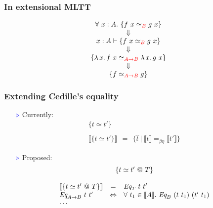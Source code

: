 \documentclass[11pt]{beamer}
\newcommand{\interp}[1]{\llbracket #1 \rrbracket}
\newcommand{\myb}[0]{\ensuremath{\textcolor{blue}{\triangleright}}}
\begin{document}
\begin{frame}
  \frametitle{In extensional MLTT}

\Large

  \[
  \begin{array}{c}
    \forall\ x : A.\ \{ f\ x \simeq_{\color{red}B} g\ x\}
    \\    
    \Downarrow
    \\    
    x : A \vdash \{ f\ x \simeq_{\color{red}B} g\ x \}
    \\
    \Downarrow
    \\    
    \{ \lambda\, x.\, f\ x \simeq_{\color{red}A\to B} \lambda\, x.\, g\ x \}
    \\
    \Downarrow
    \\    
    \{ f \simeq_{\color{red}A\to B} g \}
  \end{array}
  \]

  \vspace{1cm}

\pause
  \begin{center}
\color{purple}
\Large
    \end{center}

  \end{frame}

\begin{frame}
  \frametitle{Extending Cedille's equality}

  \begin{itemize}
    \item[$\myb$]
  Currently:
  \[
  \begin{array}{c}
    \{ t \simeq t'\} \\ \\
    \interp{\{ t \simeq t'\}} \ \ = \ \ \{ \hat{t}\ |\ \interp{t} =_{\beta\eta} \interp{t'} \}
    \end{array}
  \]

    \item[$\myb$]
  Proposed:
  \[
  \begin{array}{lcl}
    \multicolumn{3}{c}{\{ t \simeq t'\ @\ T\}} \\ \\
    \interp{\{ t \simeq t'\ @\ T\}} & = & \textit{Eq}_{T}\ t\ t' \\
    \textit{Eq}_{A\to B}\ t\ t' & \Leftrightarrow & \forall\ t_1\in\interp{A}.\ \textit{Eq}_{B}\ (t\ t_1)\ (t'\ t_1)\\
    \multicolumn{3}{l}{\cdots}
    \end{array}
    \]


\vspace{.5cm}

      \large\color{purple}

    
    \end{itemize}

\end{frame}
\end{document}
